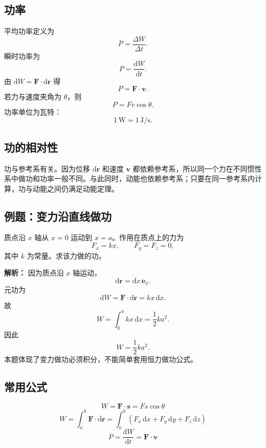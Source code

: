\subsection{功率}

平均功率定义为
\[
    \bar P=\frac{\Delta W}{\Delta t}.
\]
瞬时功率为
\[
    P=\frac{\mathrm dW}{\mathrm dt}.
\]
由 $\mathrm dW=\boldsymbol F\cdot\mathrm d\boldsymbol r$ 得
\[
    \boxed{
    P=\boldsymbol F\cdot\boldsymbol v
    } .
\]
若力与速度夹角为 $\theta$，则
\[
    P=Fv\cos\theta .
\]
功率单位为瓦特：
\[
    1\,\mathrm W=1\,\mathrm{J/s}.
\]

\subsection{功的相对性}

功与参考系有关。因为位移 $\mathrm d\boldsymbol r$ 和速度 $\boldsymbol v$ 都依赖参考系，所以同一个力在不同惯性系中做功和功率一般不同。与此同时，动能也依赖参考系；只要在同一参考系内计算，功与动能之间仍满足动能定理。

\subsection{例题：变力沿直线做功}

质点沿 $x$ 轴从 $x=0$ 运动到 $x=a$。作用在质点上的力为
\[
    F_x=kx,\qquad F_y=F_z=0,
\]
其中 $k$ 为常量。求该力做的功。

\textbf{解析：} 因为质点沿 $x$ 轴运动，
\[
    \mathrm d\boldsymbol r=\mathrm dx\,\boldsymbol e_x.
\]
元功为
\[
    \mathrm dW=\boldsymbol F\cdot\mathrm d\boldsymbol r=kx\,\mathrm dx.
\]
故
\[
    W=\int_0^a kx\,\mathrm dx=\frac{1}{2}ka^2.
\]
因此
\[
    \boxed{W=\frac{1}{2}ka^2}.
\]
本题体现了变力做功必须积分，不能简单套用恒力做功公式。

\subsection{常用公式}

\[
    W=\boldsymbol F\cdot\boldsymbol s=Fs\cos\theta
\]
\[
    \boxed{
    W=\int_a^b\boldsymbol F\cdot\mathrm d\boldsymbol r
    =
    \int_a^b
    \left(
    F_x\,\mathrm dx+F_y\,\mathrm dy+F_z\,\mathrm dz
    \right)
    }
\]
\[
    \boxed{
    P=\frac{\mathrm dW}{\mathrm dt}=\boldsymbol F\cdot\boldsymbol v
    }
\]
